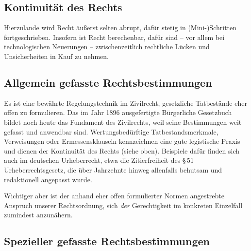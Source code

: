 \documentclass[output=paper]{langscibook}
\begin{document}
\hypertarget{kontinuituxe4t-des-rechts}{%
\subsection{Kontinuität des Rechts}\label{kontinuituxe4t-des-rechts}}

Hierzulande wird Recht äußerst selten abrupt, dafür stetig in
(Mini-)Schritten fortgeschrieben. Insofern ist Recht berechenbar, dafür
sind -- vor allem bei technologischen Neuerungen -- zwischenzeitlich
rechtliche Lücken und Unsicherheiten in Kauf zu nehmen.

\hypertarget{allgemein-gefasste-rechtsbestimmungen}{%
\subsection{Allgemein gefasste
Rechtsbestimmungen}\label{allgemein-gefasste-rechtsbestimmungen}}

Es ist eine bewährte Regelungstechnik im Zivilrecht, gesetzliche
Tatbestände eher offen zu formulieren. Das im Jahr 1896 ausgefertigte
Bürgerliche Gesetzbuch bildet noch heute das Fundament des Zivilrechts,
weil seine Bestimmungen weit gefasst und anwendbar sind.
Wertungsbedürftige Tatbestandsmerkmale, Verweisungen oder
Ermessensklauseln kennzeichnen eine gute legistische Praxis und dienen
der Kontinuität des Rechts (siehe oben). Beispiele dafür finden sich auch im
deutschen Urheberrecht, etwa die Zitierfreiheit des §\,51
Urheberrechtsgesetz, die über Jahrzehnte hinweg allenfalls behutsam und
redaktionell angepasst wurde.

Wichtiger aber ist der anhand eher offen formulierter Normen angestrebte
Anspruch unserer Rechtsordnung, sich \emph{der} Gerechtigkeit im
konkreten Einzelfall zumindest anzunähern.

\hypertarget{spezieller-gefasste-rechtsbestimmungen}{%
\subsection{Spezieller gefasste
Rechtsbestimmungen}\label{spezieller-gefasste-rechtsbestimmungen}}
\end{document}
